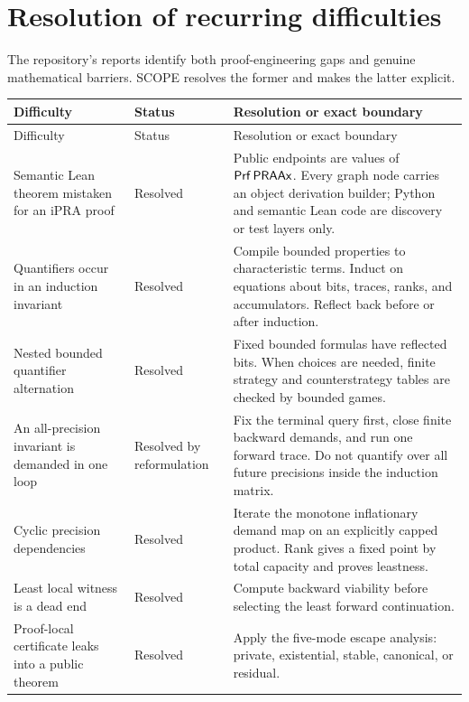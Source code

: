 \section{Resolution of recurring difficulties}

The repository's reports identify both proof-engineering gaps and genuine mathematical barriers.  SCOPE resolves the former and makes the latter explicit.

\small
\begin{longtable}{@{}p{}p{}p{}@{}}
\toprule
Difficulty & Status & Resolution or exact boundary \\
\midrule
\endfirsthead
\toprule
Difficulty & Status & Resolution or exact boundary \\
\midrule
\endhead
Semantic Lean theorem mistaken for an iPRA proof & Resolved & Public endpoints are values of \(\mathsf{Prf}\,\mathsf{PRAAx}\).  Every graph node carries an object derivation builder; Python and semantic Lean code are discovery or test layers only. \\

Quantifiers occur in an induction invariant & Resolved & Compile bounded properties to characteristic terms.  Induct on equations about bits, traces, ranks, and accumulators.  Reflect back before or after induction. \\

Nested bounded quantifier alternation & Resolved & Fixed bounded formulas have reflected bits.  When choices are needed, finite strategy and counterstrategy tables are checked by bounded games. \\

An all-precision invariant is demanded in one loop & Resolved by reformulation & Fix the terminal query first, close finite backward demands, and run one forward trace.  Do not quantify over all future precisions inside the induction matrix. \\

Cyclic precision dependencies & Resolved & Iterate the monotone inflationary demand map on an explicitly capped product.  Rank gives a fixed point by total capacity and proves leastness. \\

Least local witness is a dead end & Resolved & Compute backward viability before selecting the least forward continuation. \\

Proof-local certificate leaks into a public theorem & Resolved & Apply the five-mode escape analysis: private, existential, stable, canonical, or residual. \\


\end{longtable}
